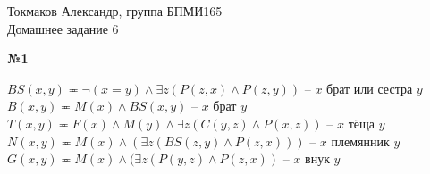 \documentclass{article}
\newenvironment{task}{\begin{center}\fontsize{14}{14}\selectfont\bf}{\rm\fontsize{12}{12}\selectfont\end{center}}
\begin{document}
	\begin{center}
		Токмаков Александр, группа БПМИ165 \\
		Домашнее задание 6
	\end{center}

	
	\begin{task} 
		№1
	\end{task}
	\begin{center}
	$BS(x, y) \eqcirc \neg(x=y) \wedge \exists z (P(z, x) \wedge P(z, y))$ -- $x$ брат или сестра $y$ \\
	$B(x, y) \eqcirc M(x) \wedge BS(x, y)$ -- $x$ брат $y$ \\
	$T(x, y) \eqcirc F(x) \wedge M(y) \wedge \exists z (C(y, z) \wedge P(x, z))$ -- $x$ тёща $y$ \\
	$N(x, y) \eqcirc M(x) \wedge (\exists z (BS(z, y) \wedge P(z, x)))$ -- $x$ племянник $y$ \\
	$G(x, y) \eqcirc M(x) \wedge (\exists z (P(y, z) \wedge P(z, x))$ -- $x$ внук $y$ \\
	\end{center}
	
\end{document}
